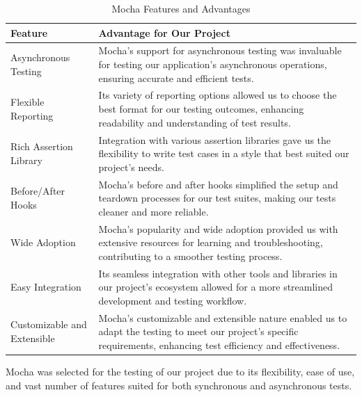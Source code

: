 \begin{table}[H]
    \centering
    \begin{tabularx}{\textwidth}{|l|X|}
        \hline
        \textbf{Feature}     & \textbf{Advantage for Our Project}                                                                                                                                  \\
        \hline
        Asynchronous Testing & Mocha's support for asynchronous testing was invaluable for testing our application's asynchronous operations, ensuring accurate and efficient tests.                   \\
        \hline
        Flexible Reporting   & Its variety of reporting options allowed us to choose the best format for our testing outcomes, enhancing readability and understanding of test results.               \\
        \hline
        Rich Assertion Library & Integration with various assertion libraries gave us the flexibility to write test cases in a style that best suited our project's needs.                          \\
        \hline
        Before/After Hooks  & Mocha's before and after hooks simplified the setup and teardown processes for our test suites, making our tests cleaner and more reliable.                           \\
        \hline
        Wide Adoption       & Mocha's popularity and wide adoption provided us with extensive resources for learning and troubleshooting, contributing to a smoother testing process.                 \\
        \hline
        Easy Integration    & Its seamless integration with other tools and libraries in our project's ecosystem allowed for a more streamlined development and testing workflow.                    \\
        \hline
        Customizable and Extensible & Mocha's customizable and extensible nature enabled us to adapt the testing to meet our project's specific requirements, enhancing test efficiency and effectiveness. \\
        \hline
    \end{tabularx}
    \label{tab:mochaTesting}
    \caption{Mocha Features and Advantages}
\end{table}

Mocha was selected for the testing of our project due to its flexibility, ease of use, and vast number of features suited for both synchronous and asynchronous tests. 

